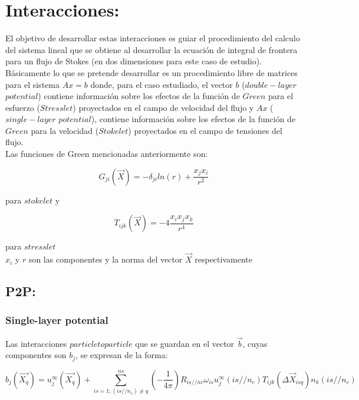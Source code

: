 \documentclass[letter,10pt]{article}
\begin{document}
\section{Interacciones:}

El objetivo de desarrollar estas interacciones es guiar el procedimiento del calculo del sistema lineal que se obtiene al desarrollar la ecuación de integral de frontera para un flujo de Stokes (en dos dimensiones para este caso de estudio).\\
Básicamente lo que se pretende desarrollar es un procedimiento libre de matrices para el sistema $Ax = b$ donde, para el caso estudiado, el vector $b$ ($double-layer$ $potential$) contiene información sobre los efectos de la función de $Green$ para el esfuerzo ($Stresslet$) proyectados en el campo de velocidad del flujo y $Ax$ ($single-layer$ $potential$), contiene información sobre los efectos de la función de $Green$ para la velocidad ($Stokelet$) proyectados en el campo de tensiones del flujo.\\ 
\indent Las funciones de Green mencionadas anteriormente son:

\begin{equation}
G_{ji}(\vec{X}) = -\delta_{ji}ln(r) + \frac{x_jx_i}{r^2}
\label{Gstokelet}
\end{equation} 

para $stokelet$ y

\begin{equation}
T_{ijk}(\vec{X}) = -4\frac{x_ix_jx_k}{r^4}
\label{Gstresslet}
\end{equation} 

para $stresslet$\\

$x_i$ y $r$ son las componentes y la norma del vector $\vec{X}$ respectivamente 

\subsection{P2P:}

\subsubsection{Single-layer potential}

Las interacciones $particle to particle$ que se guardan en el vector $\vec{b}$, cuyas componentes son $b_j$, se expresan de la forma:

$$b_j(\vec{X_q}) = u_j^{\infty}(\vec{X_q})+\sum_{is=1; {(is//n_c) \neq q}}^{ns} \left(-\frac{1}{4\pi} \right) R_{is//nc}\omega_{is} u_j^{\infty}(is//n_c)T_{ijk}(\Delta\vec{X}_{isq})n_k(is//n_c) $$ 
\end{document}
